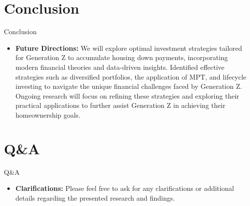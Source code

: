 \documentclass{beamer}
\begin{document}
\section{Conclusion}
\begin{frame}{Conclusion}
    \begin{itemize}
        \item \textbf{Future Directions:} We will explore optimal investment strategies tailored for Generation Z to accumulate housing down payments, incorporating modern financial theories and data-driven insights. Identified effective strategies such as diversified portfolios, the application of MPT, and lifecycle investing to navigate the unique financial challenges faced by Generation Z. Ongoing research will focus on refining these strategies and exploring their practical applications to further assist Generation Z in achieving their homeownership goals.
    \end{itemize}
\end{frame}

\section{Q\&A}
\begin{frame}{Q\&A}
    \begin{itemize}
        \item \textbf{Clarifications:} Please feel free to ask for any clarifications or additional details regarding the presented research and findings.
    \end{itemize}
\end{frame}
\end{document}

